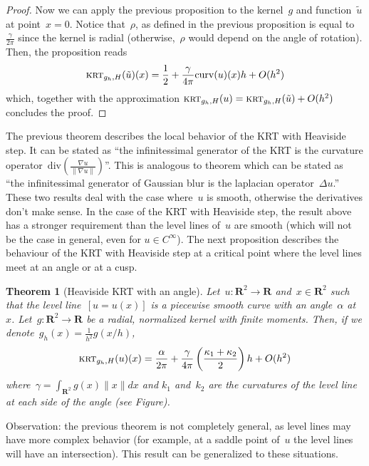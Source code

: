 \documentclass[12pt]{article}                  %
\newtheorem{theorem}{Theorem}
\begin{document}
\begin{proof}
	Now we can apply the previous proposition to the kernel~$g$ and
	function~$\tilde u$ at point~$x=0$.  Notice that~$\rho$, as defined in the
	previous proposition is equal to~$\frac{\gamma}{2\pi}$ since the kernel is
	radial (otherwise,~$\rho$ would depend on the angle of rotation).  Then, the
	proposition reads
	\[
		\textsc{krt}_{g_h,H}(\tilde
		u)(x)=\frac12+\frac{\gamma}{4\pi}\mathrm{curv}(u)(x)h + O(h^2)
	\]
	which, together with the approximation
	\(
		\textsc{krt}_{g_h,H}(u)=\textsc{krt}_{g_h,H}(\tilde u)+O(h^2)
	\)
	concludes the proof.
\end{proof}

The previous theorem %
describes the local behavior of the KRT with Heaviside step.
It can be stated as ``the infinitessimal generator of the KRT is the
curvature operator~$\mathrm{div}\left(\frac{\nabla u}{\left\|\nabla
u\right\|}\right)$''.
This is analogous to theorem  %
which can be stated as ``the infinitessimal generator of Gaussian blur is
the laplacian operator~$\Delta u$.''
These two results deal with the case where~$u$ is smooth, otherwise the
derivatives don't make sense.  In the case of the KRT with Heaviside step,
the result above has a stronger requirement than the level lines of~$u$ are
smooth (which will not be the case in general, even for $u\in C^\infty$).  The
next proposition describes the behaviour of the KRT with Heaviside step
at a critical point where the level lines meet at an angle or at a cusp.



\begin{theorem}[Heaviside KRT with an angle]
	Let~$u:\mathbf{R}^2\to\mathbf{R}$ and~$x\in\mathbf{R}^2$ such that
	the level line~$[u=u(x)]$ is a piecewise smooth curve with an
	angle~$\alpha$ at~$x$.
	Let~$g:\mathbf{R}^2\to\mathbf{R}$ be a radial,
	normalized kernel with
	finite moments.  Then, if we
	denote~$g_h(x)=\frac{1}{h^2}g(x/h)$,
	\[
		\textsc{krt}_{g_h,H}(u)(x)=\frac\alpha{2\pi}
		+
		\frac\gamma{4\pi}\left(\frac{\kappa_1+\kappa_2}2\right) h+O(h^2)
	\]
	where~$\gamma=\int_{\mathbf{R}^2}g(x)\|x\|dx$ and
	$k_1$ and~$k_2$ are the curvatures of the level line at each side of the
	angle (see Figure).
\end{theorem}

Observation: the previous theorem is not completely general, as level lines
may have more complex behavior (for example, at a saddle point of~$u$ the
level lines will have an intersection).  This result can be generalized to
these situations.
\end{document}
